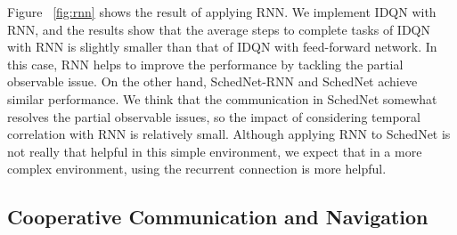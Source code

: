 Figure ~\ref{fig:rnn} shows the result of applying RNN. We implement
IDQN with RNN, and the results show that the average steps to complete
tasks of IDQN with RNN is slightly smaller than that of IDQN with
feed-forward network. In this case, RNN helps to improve the
performance by tackling the partial observable issue. On the other
hand, SchedNet-RNN and SchedNet achieve similar performance. We think
that the communication in SchedNet somewhat resolves the partial
observable issues, so the impact of considering temporal correlation
with RNN is relatively small. Although applying RNN to SchedNet is not
really that helpful in this simple environment, we expect that in a
more complex environment, using the recurrent connection is more
helpful.

\subsection{Cooperative Communication and Navigation}
\label{sec:coop-comm-navig}

